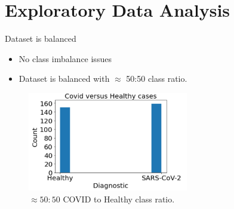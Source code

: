 

		



\section{Exploratory Data Analysis} %

\begin{frame}{Dataset is balanced}
\begin{itemize}
    \item No class imbalance issues
    \item Dataset is balanced with $\approx$ 50:50 class ratio.
\end{itemize}
\begin{figure}
		\includegraphics[width=7.0cm]{balance.png}
		\caption{$\approx 50:50$ COVID to Healthy class ratio.}
	\end{figure}

\end{frame}

